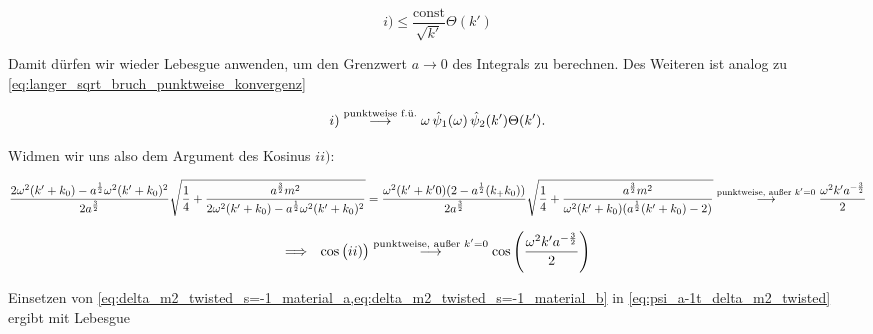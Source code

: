 \begin{dmath*}
    i)
    \leq
    \frac{\textrm{const}}{\sqrt{k'}} \Theta(k')
\end{dmath*}

Damit dürfen wir wieder Lebesgue anwenden, um den Grenzwert $a \to 0$ des Integrals zu berechnen.
Des Weiteren ist analog zu \cref{eq:langer_sqrt_bruch_punktweise_konvergenz}

\begin{dmath}
    i)
    \stackrel{\textrm{\scriptsize punktweise f.ü.}}{\longrightarrow}
    \omega\,\hat\psi_1(\omega) \,\hat\psi_2(k') \Theta(k').
\label{eq:delta_m2_twisted_s=-1_material_a}
\end{dmath}

Widmen wir uns also dem Argument des Kosinus $ii)$:

\begin{dmath*}
    \frac{2\omega^2(k'+k_0)-a^{\frac{1}{2}}\omega^2(k'+k_0)^2}
         {2 a^{\frac{3}{2}}}
    \sqrt{
        \frac{1}{4}
        + \frac{a^{\frac{3}{2}} m^2}
               {2\omega^2(k'+k_0)-a^{\frac{1}{2}}\omega^2(k'+k_0)^2}
    }
    =
    \frac{\omega^2 (k'+k'0)(2-a^{\frac{1}{2}}(k_+k_0))}
         {2 a^{\frac{3}{2}}}
    \sqrt{
        \frac{1}{4}
        + \frac{a^{\frac{3}{2}}m^2}
               {\omega^2(k'+k_0)(a^{\frac{1}{2}}(k'+k_0)-2)}
    }\\
    \stackrel{\textrm{\scriptsize punktweise, außer } k'=0}{\longrightarrow}
    \frac{\omega^2 k' a^{-\frac{3}{2}}}{2}
\end{dmath*}

\begin{dmath}
\Longrightarrow ~~
    \cos\big(ii)\big)
    \stackrel{\textrm{\scriptsize punktweise, außer } k'=0}{\longrightarrow}
    \cos\left(\frac{\omega^2 k' a^{-\frac{3}{2}}}{2}\right)
\label{eq:delta_m2_twisted_s=-1_material_b}
\end{dmath}

Einsetzen von \cref{eq:delta_m2_twisted_s=-1_material_a,eq:delta_m2_twisted_s=-1_material_b} in \cref{eq:psi_a-1t_delta_m2_twisted} ergibt mit Lebesgue

